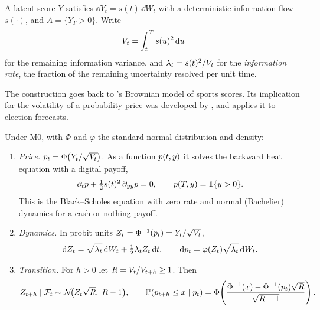 \begin{definition}[M0]\label{def:m0}
A latent score $Y$ satisfies $\dd Y_t=s(t)\,\dd W_t$ with a deterministic information flow
$s(\cdot)$, and $A=\{Y_T>0\}$. Write
\[
  V_t=\int_t^T s(u)^2\,\mathrm{d} u
\]
for the remaining information variance, and $\lambda_t=s(t)^2/V_t$ for the
\emph{information rate}, the fraction of the remaining uncertainty resolved per unit time.
\end{definition}

The construction goes back to \citet{stern1994}'s Brownian model of sports scores. Its implication
for the volatility of a probability price was developed by \citet{archakipeirotis2009}, and
\citet{taleb2018} applies it to election forecasts.

\begin{proposition}\label{prop:m0}
Under M0, with $\Phi$ and $\varphi$ the standard normal distribution and density:
\begin{enumerate}
  \item \emph{Price.} $p_t=\Phi\big(Y_t/\sqrt{V_t}\big)$. As a function $p(t,y)$ it solves the
  backward heat equation with a digital payoff,
  \begin{equation}\label{eq:pde}
    \partial_t p+\tfrac12 s(t)^2\,\partial_{yy}p=0,\qquad p(T,y)=\mathbf{1}\{y>0\}.
  \end{equation}
  This is the Black--Scholes equation with zero rate and normal (Bachelier) dynamics for a
  cash-or-nothing payoff.
  \item \emph{Dynamics.} In probit units $Z_t=\Phi^{-1}(p_t)=Y_t/\sqrt{V_t}$,
  \begin{equation}\label{eq:zdyn}
    \mathrm{d}Z_t=\sqrt{\lambda_t}\,\mathrm{d} W_t+\tfrac12\lambda_tZ_t\,\mathrm{d} t,\qquad
    \mathrm{d}p_t=\varphi(Z_t)\sqrt{\lambda_t}\,\mathrm{d} W_t .
  \end{equation}
  \item \emph{Transition.} For $h>0$ let $R=V_t/V_{t+h}\ge1$. Then
  \begin{equation}\label{eq:transition}
    Z_{t+h}\mid\mathcal{F}_t\sim\mathcal{N}\!\big(Z_t\sqrt R,\;R-1\big),\qquad
    \mathbb{P}(p_{t+h}\le x\mid p_t)=\Phi\!\left(\frac{\Phi^{-1}(x)-\Phi^{-1}(p_t)\sqrt R}{\sqrt{R-1}}\right).
  \end{equation}
\end{enumerate}
\end{proposition}

